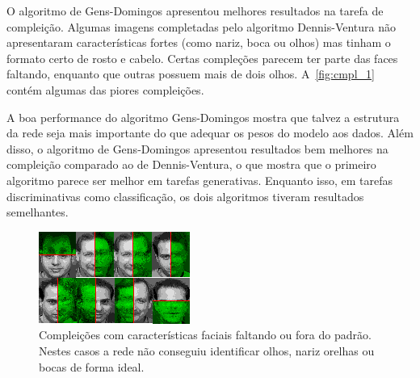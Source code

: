\documentclass[12pt]{article}
\theoremstyle{plain}
\numberwithin{equation}{section}
\begin{document}
O algoritmo de Gens-Domingos apresentou melhores resultados na tarefa de compleição. Algumas
imagens completadas pelo algoritmo Dennis-Ventura não apresentaram características fortes (como
nariz, boca ou olhos) mas tinham o formato certo de rosto e cabelo. Certas compleções parecem ter
parte das faces faltando, enquanto que outras possuem mais de dois olhos. A~\autoref{fig:cmpl_1}
contém algumas das piores compleições.

A boa performance do algoritmo Gens-Domingos mostra que talvez a estrutura da rede seja mais
importante do que adequar os pesos do modelo aos dados. Além disso, o algoritmo de Gens-Domingos
apresentou resultados bem melhores na compleição comparado ao de Dennis-Ventura, o que mostra que o
primeiro algoritmo parece ser melhor em tarefas generativas. Enquanto isso, em tarefas
discriminativas como classificação, os dois algoritmos tiveram resultados semelhantes.

\begin{figure}[H]
  \centering\includegraphics[scale=2.5]{cmpl/notfine/notfine.png}
  \caption{Compleições com características faciais faltando ou fora do padrão. Nestes casos a rede
    não conseguiu identificar olhos, nariz orelhas ou bocas de forma ideal.\label{fig:cmpl_1}}
\end{figure}
\end{document}
